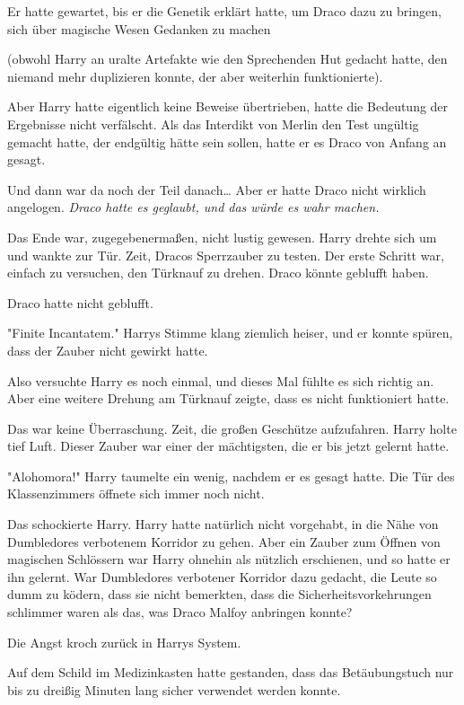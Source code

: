 {Er hatte gewartet, bis er die Genetik erklärt hatte, um Draco dazu zu bringen, sich über magische Wesen Gedanken zu machen

(obwohl Harry an uralte Artefakte wie den Sprechenden Hut gedacht hatte, den niemand mehr duplizieren konnte, der aber weiterhin funktionierte).

Aber Harry hatte eigentlich keine Beweise übertrieben, hatte die Bedeutung der Ergebnisse nicht verfälscht. Als das Interdikt von Merlin den Test ungültig gemacht hatte, der endgültig hätte sein sollen, hatte er es Draco von Anfang an gesagt.

Und dann war da noch der Teil danach… Aber er hatte Draco nicht wirklich angelogen. \emph{Draco hatte es geglaubt, und das würde es wahr machen.}

Das Ende war, zugegebenermaßen, nicht lustig gewesen. Harry drehte sich um und wankte zur Tür. Zeit, Dracos Sperrzauber zu testen. Der erste Schritt war, einfach zu versuchen, den Türknauf zu drehen. Draco könnte geblufft haben.

Draco hatte nicht geblufft.

"Finite Incantatem." Harrys Stimme klang ziemlich heiser, und er konnte spüren, dass der Zauber nicht gewirkt hatte.

Also versuchte Harry es noch einmal, und dieses Mal fühlte es sich richtig an. Aber eine weitere Drehung am Türknauf zeigte, dass es nicht funktioniert hatte.

Das war keine Überraschung. Zeit, die großen Geschütze aufzufahren. Harry holte tief Luft. Dieser Zauber war einer der mächtigsten, die er bis jetzt gelernt hatte.

"Alohomora!" Harry taumelte ein wenig, nachdem er es gesagt hatte. Die Tür des Klassenzimmers öffnete sich immer noch nicht.

Das schockierte Harry. Harry hatte natürlich nicht vorgehabt, in die Nähe von Dumbledores verbotenem Korridor zu gehen. Aber ein Zauber zum Öffnen von magischen Schlössern war Harry ohnehin als nützlich erschienen, und so hatte er ihn gelernt. War Dumbledores verbotener Korridor dazu gedacht, die Leute so dumm zu ködern, dass sie nicht bemerkten, dass die Sicherheitsvorkehrungen schlimmer waren als das, was Draco Malfoy anbringen konnte?

Die Angst kroch zurück in Harrys System.

Auf dem Schild im Medizinkasten hatte gestanden, dass das Betäubungstuch nur bis zu dreißig Minuten lang sicher verwendet werden konnte.

}
